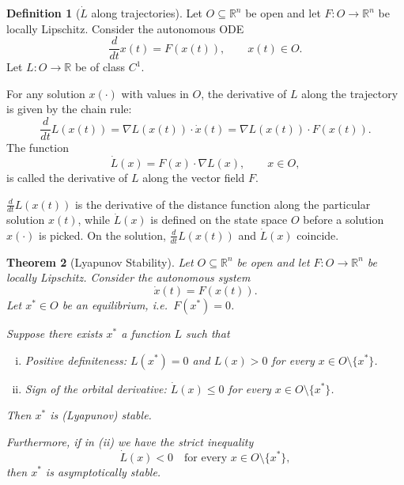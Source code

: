\documentclass{tufte-handout}
\newcommand*\R{\mathbb{R}}
\newtheorem{thm}{Theorem}[subsection]
\theoremstyle{definition}
\newtheorem{defn}[thm]{Definition}
\begin{document}
\begin{defn}[$\dot L$ along trajectories]
	Let $O \subseteq \R^n$ be open and let $F:O \to \R^n$ be locally Lipschitz. Consider the autonomous ODE
	\[
		\frac{d}{dt}x (t) = F(x(t)), \qquad x(t) \in O.
	\]
	Let $L:O \to \R$ be of class $C^1$.

	For any solution $x(\cdot)$ with values in $O$, the derivative of $L$ along the trajectory is given by the chain rule:
	\[
		\frac{d}{dt} L(x(t)) 
			= \nabla L(x(t)) \cdot \dot x(t)
			= \nabla L(x(t)) \cdot F(x(t)).
	\]
	The function
	\[
		\dot L(x) = F(x) \cdot \nabla L(x), \qquad x \in O,
	\]
	is called the derivative of $L$ along the vector field $F$.

	$\frac{d}{dt}L(x(t))$ is the derivative of the distance function along the particular solution $x(t)$, while $\dot{L}(x)$ is defined on the state space $O$ before a solution $x(\cdot )$ is picked. On the solution, $\frac{d}{dt}L(x(t))$ and $\dot{L}(x)$ coincide.
\end{defn}

\begin{thm}[Lyapunov Stability]
	Let $O \subseteq \R^n$ be open and let $F:O \to \R^n$ be locally Lipschitz. Consider the autonomous system
	\[
		\dot x(t) = F(x(t)).
	\]
	Let $x^* \in O$ be an equilibrium, i.e.\ $F(x^*) = 0$. 

	Suppose there exists $x^*$ a function $L$ such that
	\begin{enumerate}[(i)]
		\item \emph{Positive definiteness:} $L(x^*) = 0$ and $L(x) > 0$ for every $x \in O \setminus \{x^*\}$.
		\item \emph{Sign of the orbital derivative:} $\dot L(x) \le 0$ for every $x \in O \setminus \{x^*\}$.
	\end{enumerate}
	Then $x^*$ is (Lyapunov) stable.

	Furthermore, if in (ii) we have the strict inequality
	\[
		\dot L(x) < 0 \quad \text{for every } x \in O \setminus \{x^*\},
	\]
	then $x^*$ is asymptotically stable.
\end{thm}
\end{document}
